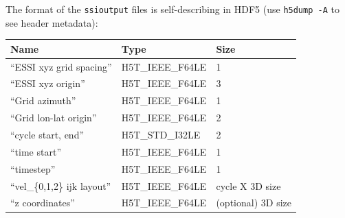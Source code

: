 \documentclass[11pt]{report}
\begin{document}
{The format of the \verb+ssioutput+ files is self-describing in HDF5
(use {\tt h5dump -A} to see header metadata):
\begin{center}
	\begin{tabular}{lll}\hline
		Name                          & Type             & Size               \\ \hline
		``ESSI xyz grid spacing''     & H5T\_IEEE\_F64LE & 1                  \\ \hline
		``ESSI xyz origin''           & H5T\_IEEE\_F64LE & 3                  \\ \hline
		``Grid azimuth''              & H5T\_IEEE\_F64LE & 1                  \\ \hline
		``Grid lon-lat origin''       & H5T\_IEEE\_F64LE & 2                  \\ \hline
		``cycle start, end''          & H5T\_STD\_I32LE  & 2                  \\ \hline
		``time start''                & H5T\_IEEE\_F64LE & 1                  \\ \hline
		``timestep''                  & H5T\_IEEE\_F64LE & 1                  \\ \hline
		``vel\_\{0,1,2\} ijk layout'' & H5T\_IEEE\_F64LE & cycle X 3D size    \\ \hline
		``z coordinates''             & H5T\_IEEE\_F64LE & (optional) 3D size \\ \hline
	\end{tabular}
\end{center}





}
\end{document}
